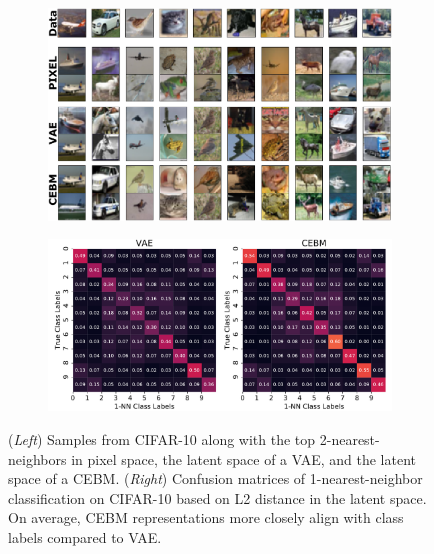 \documentclass{article}
\begin{document}
\begin{figure}[!t]
\centering
\begin{subfigure}{0.4\textwidth}
\centering
\includegraphics[width=\linewidth]{figures/overview_figure.pdf}
\end{subfigure}%
\begin{subfigure}{0.55\textwidth}
\centering
\includegraphics[width=\linewidth]{figures/confusion_matrix_22row_cifar10.pdf}
\end{subfigure}
\vspace*{-1ex}
\caption{(\emph{Left}) Samples from CIFAR-10 along with the top 2-nearest-neighbors in pixel space, the latent space of a VAE, and the latent space of a CEBM. (\emph{Right}) Confusion matrices of 1-nearest-neighbor classification on CIFAR-10 based on L2 distance in the latent space. On average, CEBM representations more closely align with class labels compared to VAE.}
\label{fig:nearest-neighbours}
\vspace*{-1.5ex}
\end{figure}
\end{document}
